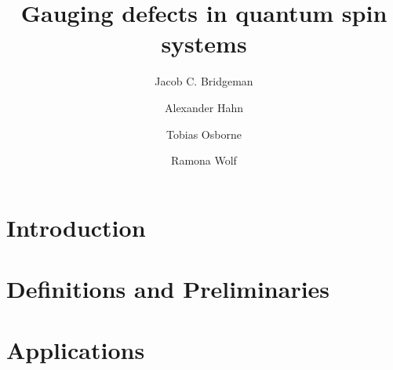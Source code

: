 
\title{Gauging defects in quantum spin systems}
\author{Jacob C. Bridgeman}
\author{Alexander Hahn}
\author{Tobias Osborne}
\author{Ramona Wolf}




\maketitle

\begin{abstract}
	
\end{abstract}

\section{Introduction}


\section{Definitions and Preliminaries}





\section{Applications}






